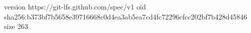 version https://git-lfs.github.com/spec/v1
oid sha256:b373bf7b5658e39716668c0d4ea3ab5ea7cd4fc72296cfcc202bf7b428d45846
size 263
